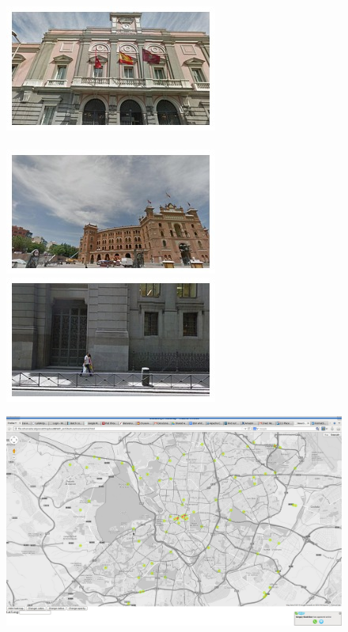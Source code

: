 \begin{figure}
\begin{minipage}{\linewidth}
\begin{minipage}{0.3\linewidth}
      \includegraphics[width=0.49\linewidth]{imgs/arch/mosaicsS1/mosaic0025.jpg}
      \\ \vspace{-3mm} \\
      \includegraphics[width=0.49\linewidth]{imgs/arch/mosaicsS1/mosaic0030.jpg}
      \includegraphics[width=0.49\linewidth]{imgs/arch/mosaicsS1/mosaic0032.jpg}
    \end{minipage}
    \begin{minipage}{0.7\linewidth}
      \includegraphics[trim= 350 150 250 150, clip=true, width=\linewidth]{imgs/arch/mapS1.jpg}

\end{minipage}
\end{minipage}
\end{figure}
